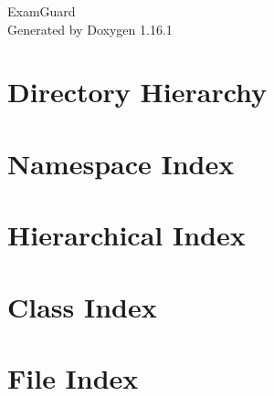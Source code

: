 \documentclass[twoside]{book}
\newcommand{\+}{\discretionary{\mbox{\scriptsize$\hookleftarrow$}}{}{}}
\newcommand{\clearemptydoublepage}{%
    \newpage{\pagestyle{empty}\cleardoublepage}%
  }
\begin{document}
  \raggedbottom
    \hypersetup{pageanchor=false,
                bookmarksnumbered=true,
                pdfencoding=unicode
               }
  \begin{titlepage}
  \vspace*{7cm}
  \begin{center}%
  {\Large Exam\+Guard}\\
  \vspace*{1cm}
  {\large Generated by Doxygen 1.16.1}\\
  \end{center}
  \end{titlepage}
  \clearemptydoublepage
  \tableofcontents
  \clearemptydoublepage
  \hypersetup{pageanchor=true}
\chapter{Directory Hierarchy}

\chapter{Namespace Index}

\chapter{Hierarchical Index}

\chapter{Class Index}

\chapter{File Index}

\end{document}

